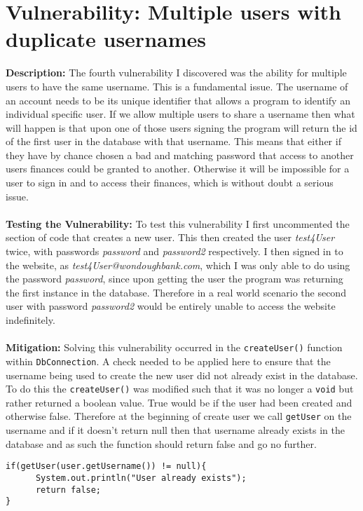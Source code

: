 \section{Vulnerability: Multiple users with duplicate usernames}
\label{sec:background}
\textbf{Description:} The fourth vulnerability I discovered was the ability for multiple users to have the same username. This is a fundamental issue. The username of an account
needs to be its unique identifier that allows a program to identify an individual specific user. If we allow multiple users to share a username then what will happen is that
upon one of those users signing the program will return the id of the first user in the database with that username. This means that either if they have by chance chosen a
bad and matching password that access to another users finances could be granted to another. Otherwise it will be impossible for a user to sign in and to access their finances,
which is without doubt a serious issue.\\ \\
\textbf{Testing the Vulnerability:} To test this vulnerability I first uncommented the section of code that creates a new user. This then created the user \textit{test4User}
twice, with passwords \textit{password} and \textit{password2} respectively. I then signed in to the website, as \textit{test4User@wondoughbank.com}, which I was only able to
do using the password \textit{password}, since upon getting the user the program was returning the first instance in the database. Therefore in a real world scenario the second
user with password \textit{password2} would be entirely unable to access the website indefinitely.\\ \\
\textbf{Mitigation:} Solving this vulnerability occurred in the \verb|createUser()| function within \verb|DbConnection|. A check needed to be applied here to ensure that the
username being used to create the new user did not already exist in the database. To do this the \verb|createUser()| was modified such that it was no longer a \verb|void| but rather
returned a boolean value. True would be if the user had been created and otherwise false. Therefore at the beginning of create user we call \verb|getUser| on the username and
if it doesn't return null then that username already exists in the database and as such the function should return false and go no further.
\begin{verbatim}
if(getUser(user.getUsername()) != null){
      System.out.println("User already exists");
      return false;
}
\end{verbatim}
